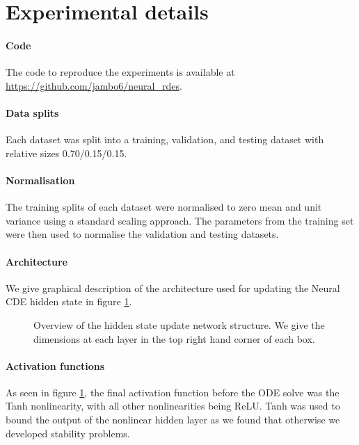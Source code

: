 \section{Experimental details} \label{apx:experiments}

\paragraph{Code} The code to reproduce the experiments is available at \url{https://github.com/jambo6/neural_rdes}. 

\paragraph{Data splits} Each dataset was split into a training, validation, and testing dataset with relative sizes 0.70/0.15/0.15. 

\paragraph{Normalisation} The training splits of each dataset were normalised to zero mean and unit variance using a standard scaling approach. The parameters from the training set were then used to normalise the validation and testing datasets. 

\paragraph{Architecture} We give graphical description of the architecture used for updating the Neural CDE hidden state in figure \ref{fig:network_diagram}.

\begin{figure}
    \centering
    
    \caption{Overview of the hidden state update network structure. We give the dimensions at each layer in the top right hand corner of each box.} 
    \label{fig:network_diagram}
\end{figure}


\paragraph{Activation functions} As seen in figure \ref{fig:network_diagram}, the final activation function before the ODE solve was the Tanh nonlinearity, with all other nonlinearities being ReLU. Tanh was used to bound the output of the nonlinear hidden layer as we found that otherwise we developed stability problems. 

